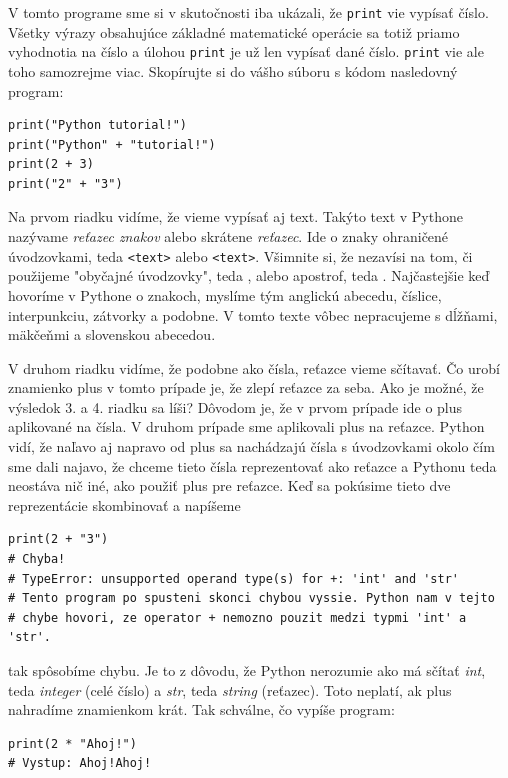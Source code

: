 \documentclass{article}
\begin{document}
V tomto programe sme si v skutočnosti iba ukázali, že \texttt{print} vie vypísať číslo. Všetky výrazy obsahujúce základné matematické operácie sa totiž priamo vyhodnotia na číslo a úlohou \texttt{print} je už len vypísať dané číslo. \texttt{print} vie ale toho samozrejme viac. Skopírujte si do vášho súboru s kódom nasledovný program:

\begin{lstlisting}
print("Python tutorial!")
print("Python" + "tutorial!")
print(2 + 3)
print("2" + "3")
\end{lstlisting}

Na prvom riadku vidíme, že vieme vypísať aj text. Takýto text v Pythone nazývame \textit{reťazec znakov} alebo skrátene \textit{reťazec}. Ide o znaky ohraničené úvodzovkami, teda \texttt{\textquotedbl<text>\textquotedbl} alebo \texttt{\textquotesingle<text>\textquotesingle}. Všimnite si, že nezavísi na tom, či použijeme "obyčajné úvodzovky", teda \texttt{\textquotedbl}, alebo apostrof, teda \textquotesingle. Najčastejšie keď hovoríme v Pythone o znakoch, myslíme tým anglickú abecedu, číslice, interpunkciu, zátvorky a podobne. V tomto texte vôbec nepracujeme s dĺžňami, mäkčeňmi a slovenskou abecedou.

V druhom riadku vidíme, že podobne ako čísla, reťazce vieme sčítavať. Čo urobí znamienko plus v tomto prípade je, že zlepí reťazce za seba. Ako je možné, že výsledok 3. a 4. riadku sa líši? Dôvodom je, že v prvom prípade ide o plus aplikované na čísla. V druhom prípade sme aplikovali plus na reťazce. Python vidí, že naľavo aj napravo od plus sa nachádzajú čísla s úvodzovkami okolo čím sme dali najavo, že chceme tieto čísla reprezentovať ako reťazce a Pythonu teda neostáva nič iné, ako použiť plus pre reťazce.
Keď sa pokúsime tieto dve reprezentácie skombinovať a 
napíšeme

\begin{lstlisting}
print(2 + "3")
# Chyba! 
# TypeError: unsupported operand type(s) for +: 'int' and 'str'
# Tento program po spusteni skonci chybou vyssie. Python nam v tejto
# chybe hovori, ze operator + nemozno pouzit medzi typmi 'int' a 'str'.
\end{lstlisting}

tak spôsobíme chybu. Je to z dôvodu, že Python nerozumie ako má sčítať \textit{int}, teda \textit{integer} (celé číslo) a \textit{str}, teda \textit{string} (reťazec). Toto neplatí, ak plus nahradíme znamienkom krát. Tak schválne, čo vypíše program:

\begin{lstlisting}
print(2 * "Ahoj!")
# Vystup: Ahoj!Ahoj!
\end{lstlisting}
\end{document}
